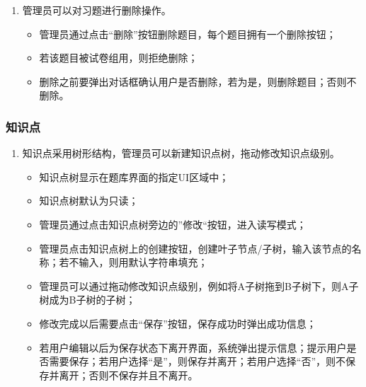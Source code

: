 \documentclass{article}
\begin{document}
\begin{enumerate}
        \item 管理员可以对习题进行删除操作。
        \begin{itemize}
            \item 管理员通过点击“删除”按钮删除题目，每个题目拥有一个删除按钮；
            \item 若该题目被试卷组用，则拒绝删除；
            \item 删除之前要弹出对话框确认用户是否删除，若为是，则删除题目；否则不删除。
        \end{itemize}

    \end{enumerate}

    \subsubsection{知识点}
    \begin{enumerate}
        \item 知识点采用树形结构，管理员可以新建知识点树，拖动修改知识点级别。
        \begin{itemize}
            \item 知识点树显示在题库界面的指定UI区域中；
            \item 知识点树默认为只读；
            \item 管理员通过点击知识点树旁边的”修改“按钮，进入读写模式；
            \item 管理员点击知识点树上的创建按钮，创建叶子节点/子树，输入该节点的名称；若不输入，则用默认字符串填充；
            \item 管理员可以通过拖动修改知识点级别，例如将A子树拖到B子树下，则A子树成为B子树的子树；
            \item 修改完成以后需要点击“保存”按钮，保存成功时弹出成功信息；
            \item 若用户编辑以后为保存状态下离开界面，系统弹出提示信息；提示用户是否需要保存；若用户选择“是”，则保存并离开；若用户选择“否”，则不保存并离开；否则不保存并且不离开。
        \end{itemize}
    \end{enumerate}
\end{document}
